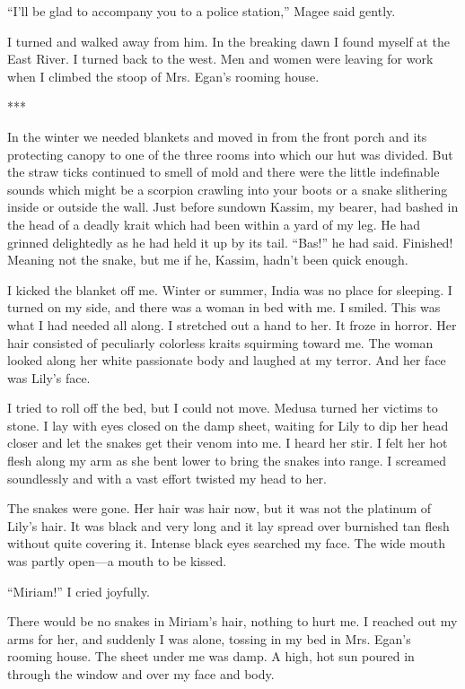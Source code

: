 {“I’ll be glad to accompany you to a police station,” Magee said gently.

I turned and walked away from him. In the breaking dawn I found myself at the East River. I turned back to the west. Men and women were leaving for work when I climbed the stoop of Mrs. Egan’s rooming house.

***

In the winter we needed blankets and moved in from the front porch and its protecting canopy to one of the three rooms into which our hut was divided. But the straw ticks continued to smell of mold and there were the little indefinable sounds which might be a scorpion crawling into your boots or a snake slithering inside or outside the wall. Just before sundown Kassim, my bearer, had bashed in the head of a deadly krait which had been within a yard of my leg. He had grinned delightedly as he had held it up by its tail. “Bas!” he had said. Finished! Meaning not the snake, but me if he, Kassim, hadn’t been quick enough.

I kicked the blanket off me. Winter or summer, India was no place for sleeping. I turned on my side, and there was a woman in bed with me. I smiled. This was what I had needed all along. I stretched out a hand to her. It froze in horror. Her hair consisted of peculiarly colorless kraits squirming toward me. The woman looked along her white passionate body and laughed at my terror. And her face was Lily’s face.

I tried to roll off the bed, but I could not move. Medusa turned her victims to stone. I lay with eyes closed on the damp sheet, waiting for Lily to dip her head closer and let the snakes get their venom into me. I heard her stir. I felt her hot flesh along my arm as she bent lower to bring the snakes into range. I screamed soundlessly and with a vast effort twisted my head to her.

The snakes were gone. Her hair was hair now, but it was not the platinum of Lily’s hair. It was black and very long and it lay spread over burnished tan flesh without quite covering it. Intense black eyes searched my face. The wide mouth was partly open—a mouth to be kissed.

“Miriam!” I cried joyfully.

There would be no snakes in Miriam’s hair, nothing to hurt me. I reached out my arms for her, and suddenly I was alone, tossing in my bed in Mrs. Egan’s rooming house. The sheet under me was damp. A high, hot sun poured in through the window and over my face and body.

}
